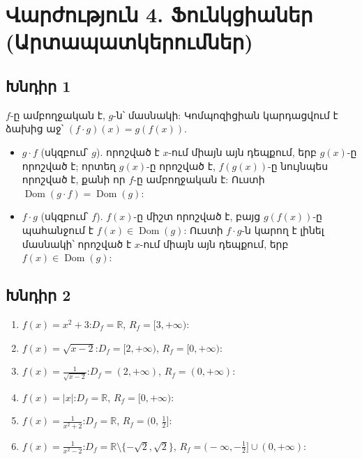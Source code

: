 \section*{Վարժություն 4. Ֆունկցիաներ (Արտապատկերումներ)}

\subsection*{Խնդիր 1}
$f$-ը ամբողջական է, $g$-ն՝ մասնակի: Կոմպոզիցիան կարդացվում է ձախից աջ՝ $(f\cdot g)(x)=g(f(x))$.
\begin{itemize}[nosep]
  \item $g\cdot f$ (սկզբում՝ $g$). որոշված է $x$-ում միայն այն դեպքում, երբ $g(x)$-ը որոշված է; որտեղ $g(x)$-ը որոշված է, $f(g(x))$-ը նույնպես որոշված է, քանի որ $f$-ը ամբողջական է: Ուստի $\operatorname{Dom}(g\cdot f)=\operatorname{Dom}(g)$:
  \item $f\cdot g$ (սկզբում՝ $f$). $f(x)$-ը միշտ որոշված է, բայց $g(f(x))$-ը պահանջում է $f(x)\in\operatorname{Dom}(g)$: Ուստի $f\cdot g$-ն կարող է լինել մասնակի՝ որոշված է $x$-ում միայն այն դեպքում, երբ $f(x)\in\operatorname{Dom}(g)$:
\end{itemize}

\subsection*{Խնդիր 2}
\begin{enumerate}[label=(\alph*), nosep]
  \item $f(x)=x^2+3$:\quad $D_f = \mathbb{R}$,\; $R_f = [3,+\infty)$:
  \item $f(x)=\sqrt{x-2}$:\quad $D_f = [2,+\infty)$,\; $R_f = [0,+\infty)$:
  \item $f(x)=\frac{1}{\sqrt{x-2}}$:\quad $D_f = (2,+\infty)$,\; $R_f = (0,+\infty)$:
  \item $f(x)=|x|$:\quad $D_f = \mathbb{R}$,\; $R_f = [0,+\infty)$:
  \item $f(x)=\frac{1}{x^2+2}$:\quad $D_f = \mathbb{R}$,\; $R_f = \bigl(0,\,\tfrac{1}{2}\bigr]$:
  \item $f(x)=\frac{1}{x^2-2}$:\quad $D_f = \mathbb{R}\setminus\{-\sqrt{2},\sqrt{2}\}$,\; $R_f = \bigl(-\infty,-\tfrac{1}{2}\bigr]\cup(0,+\infty)$:
\end{enumerate}

